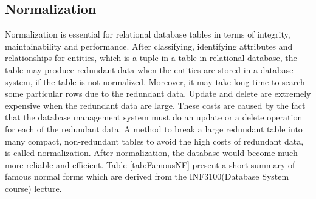 \subsection{Normalization}
Normalization is essential for relational database tables in terms of integrity, maintainability and performance. After classifying, identifying attributes and relationships for entities, which is a tuple in a table in relational database, the table may produce redundant data when the entities are stored in a database system, if the table is not normalized. Moreover, it may take long time to search some particular rows due to the redundant data. Update and delete are extremely expensive when the redundant data are large. These costs are caused by the fact that the database management system must do an update or a delete operation for each of the redundant data. A method to break a large redundant table into many compact, non-redundant tables to avoid the high costs of redundant data, is called normalization. After normalization, the database would become much more reliable and efficient. Table \ref{tab:FamousNF} present a short summary of famous normal forms which are derived from the INF3100(Database System course)\cite{INF3100} lecture.
